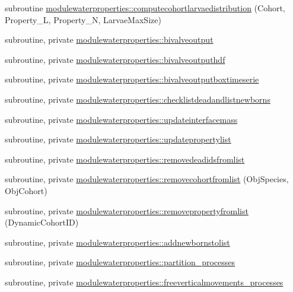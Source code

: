 \begin{DoxyCompactItemize}
\item 
subroutine \mbox{\hyperlink{namespacemodulewaterproperties_a21e9506395b0784b11cea81e68719de8}{modulewaterproperties\+::computecohortlarvaedistribution}} (Cohort, Property\+\_\+L, Property\+\_\+N, Larvae\+Max\+Size)
\item 
subroutine, private \mbox{\hyperlink{namespacemodulewaterproperties_a8446703f7cbfef308ed1b6f7114594a2}{modulewaterproperties\+::bivalveoutput}}
\item 
subroutine, private \mbox{\hyperlink{namespacemodulewaterproperties_a6d9213c5f38db58c01899d8b68076950}{modulewaterproperties\+::bivalveoutputhdf}}
\item 
subroutine, private \mbox{\hyperlink{namespacemodulewaterproperties_afcdb7811c7721d558a0d6ec94b87f297}{modulewaterproperties\+::bivalveoutputboxtimeserie}}
\item 
subroutine, private \mbox{\hyperlink{namespacemodulewaterproperties_ab88c2923a48aacf7da60a45cfeb98dfc}{modulewaterproperties\+::checklistdeadandlistnewborns}}
\item 
subroutine, private \mbox{\hyperlink{namespacemodulewaterproperties_a20082ef8bcaf7ce51aa737521cbeea5b}{modulewaterproperties\+::updateinterfacemass}}
\item 
subroutine, private \mbox{\hyperlink{namespacemodulewaterproperties_a8ab7e6ee60b7c71bc6775c1586bd99b3}{modulewaterproperties\+::updatepropertylist}}
\item 
subroutine, private \mbox{\hyperlink{namespacemodulewaterproperties_a474948faf0bbb3ab44002a8cce97817b}{modulewaterproperties\+::removedeadidsfromlist}}
\item 
subroutine, private \mbox{\hyperlink{namespacemodulewaterproperties_a3ee71384b4a5e160513a569765f2a4ba}{modulewaterproperties\+::removecohortfromlist}} (Obj\+Species, Obj\+Cohort)
\item 
subroutine, private \mbox{\hyperlink{namespacemodulewaterproperties_a3d6f2d4c903cf8071d0cba596db412f1}{modulewaterproperties\+::removepropertyfromlist}} (Dynamic\+Cohort\+ID)
\item 
subroutine, private \mbox{\hyperlink{namespacemodulewaterproperties_a201bc7106a0e1c889114fc878140e91f}{modulewaterproperties\+::addnewbornstolist}}
\item 
subroutine, private \mbox{\hyperlink{namespacemodulewaterproperties_a24b8d7aa76331b7a72150e027594beba}{modulewaterproperties\+::partition\+\_\+processes}}
\item 
subroutine, private \mbox{\hyperlink{namespacemodulewaterproperties_a877a92e454e3c5723e48cbb8f6c322d8}{modulewaterproperties\+::freeverticalmovements\+\_\+processes}}

\end{DoxyCompactItemize}
